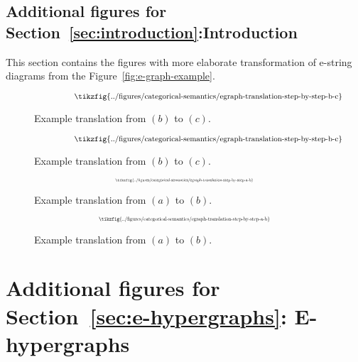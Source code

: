 \subsection{Additional figures for Section~\ref{sec:introduction}:Introduction}
\fi

This section contains the figures with more elaborate transformation of e-string diagrams from the Figure~\ref{fig:e-graph-example}.

\ifdefined\ONECOLUMN
\begin{figure}[htb!]
    \vspace{-3cm}
    \centering
    \[
        \hspace{1.3cm}
        \resizebox{0.8\textwidth}{!}{
        \tikzfig{../figures/categorical-semantics/egraph-translation-step-by-step-b-c}
        }
    \]
    \caption{Example translation from $(b)$ to $(c)$.}
    \label{fig:e-graph-example-b-c}
\end{figure}
\else
\begin{figure*}[htb!]
    \vspace{-3cm}
    \centering
    \[
        \hspace{1.3cm}
        \resizebox{0.8\textwidth}{!}{
        \tikzfig{../figures/categorical-semantics/egraph-translation-step-by-step-b-c}
        }
    \]
    \caption{Example translation from $(b)$ to $(c)$.}
    \label{fig:e-graph-example-b-c}
\end{figure*}
\fi

\ifdefined\ONECOLUMN
\begin{figure}[htb!]
    \[
        \scalebox{0.4}{
        \tikzfig{../figures/categorical-semantics/egraph-translation-step-by-step-a-b}
        }
    \]
    \caption{Example translation from $(a)$ to $(b)$.}
    \label{fig:e-graph-example-a-b}
\end{figure}
\else
\begin{figure*}[htb!]
    \[
        \scalebox{0.5}{
        \tikzfig{../figures/categorical-semantics/egraph-translation-step-by-step-a-b}
        }
    \]
    \caption{Example translation from $(a)$ to $(b)$.}
    \label{fig:e-graph-example-a-b}
\end{figure*}
\fi

\ifdefined\ONECOLUMN
\section{Additional figures for Section~\ref{sec:e-hypergraphs}: E-hypergraphs}
\else
